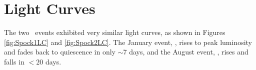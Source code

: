 \section{Light Curves}\label{sec:LightCurves}

The two \spock\ events exhibited very similar light curves, as shown in Figures \ref{fig:Spock1LC} and \ref{fig:Spock2LC}.  The January event, \spockone, rises to peak luminosity and fades back to quiescence in only $\sim$7 days, and the August event, \spocktwo, rises and falls in $<20$ days.  
  
  
  